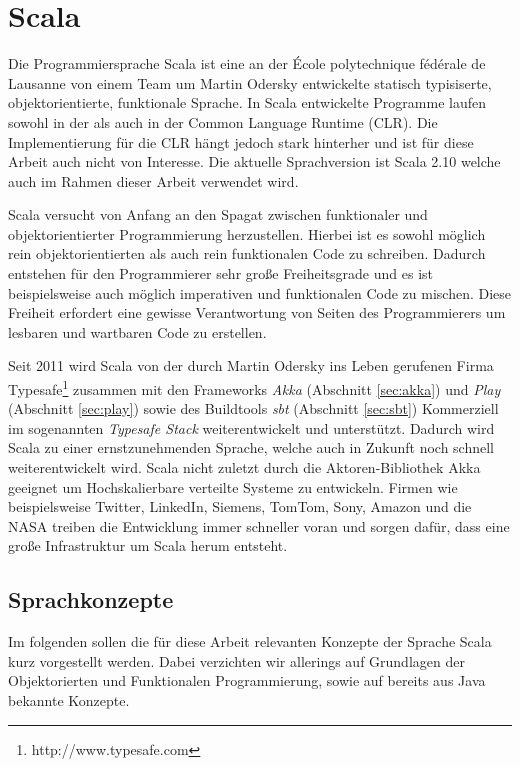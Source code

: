 \section{Scala}

Die Programmiersprache Scala ist eine an der École polytechnique fédérale de  Lausanne von einem
Team um Martin Odersky entwickelte statisch typisiserte,  objektorientierte, funktionale
Sprache. In Scala entwickelte Programme laufen  sowohl in der  als auch in der
Common  Language Runtime (CLR). Die Implementierung für die CLR hängt jedoch stark  hinterher und
ist für diese Arbeit auch nicht von Interesse. Die aktuelle Sprachversion ist Scala 2.10 welche auch
im Rahmen dieser Arbeit verwendet wird.

Scala versucht von Anfang an den Spagat zwischen funktionaler und  objektorientierter Programmierung
herzustellen. Hierbei ist es sowohl möglich  rein objektorientierten als auch rein funktionalen Code
zu schreiben. Dadurch  entstehen für den Programmierer sehr große Freiheitsgrade und es ist
beispielsweise auch möglich imperativen und funktionalen Code zu mischen. Diese  Freiheit erfordert
eine gewisse Verantwortung von Seiten des Programmierers um  lesbaren und wartbaren Code zu
erstellen.

Seit 2011 wird Scala von der durch Martin Odersky ins Leben gerufenen Firma
Typesafe\footnote{http://www.typesafe.com} zusammen mit den Frameworks \textit{Akka}
(Abschnitt \ref{sec:akka}) und \textit{Play} (Abschnitt \ref{sec:play}) sowie des Buildtools
\textit{sbt} (Abschnitt \ref{sec:sbt}) Kommerziell im sogenannten \textit{Typesafe Stack}
weiterentwickelt und unterstützt. Dadurch wird Scala zu einer ernstzunehmenden Sprache, welche auch
in Zukunft noch schnell weiterentwickelt wird. Scala nicht zuletzt durch die Aktoren-Bibliothek Akka
geeignet um Hochskalierbare verteilte Systeme zu entwickeln. Firmen wie beispielsweise Twitter,
LinkedIn, Siemens, TomTom, Sony, Amazon und die NASA treiben die Entwicklung immer schneller voran
und sorgen dafür, dass eine große Infrastruktur um Scala herum entsteht. \cite{scala}

\subsection{Sprachkonzepte}

Im folgenden sollen die für diese Arbeit relevanten Konzepte der Sprache Scala kurz vorgestellt
werden. Dabei verzichten wir allerings auf Grundlagen der Objektorierten und Funktionalen
Programmierung, sowie auf bereits aus Java bekannte Konzepte.

